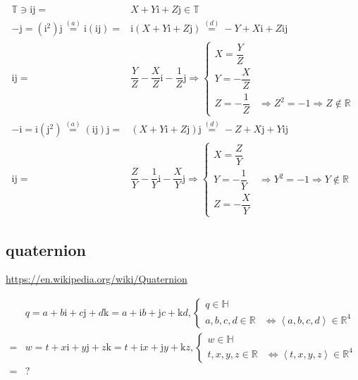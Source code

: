 \documentclass[
]{book}
\theoremstyle{definition}
\theoremstyle{definition}
\theoremstyle{definition}
\theoremstyle{definition}
\theoremstyle{remark}
\begin{document}
\[
\begin{aligned}
\mathbb{T}\ni\mathrm{i}\mathrm{j}= & X+Y\mathrm{i}+Z\mathrm{j}\in\mathbb{T}\\
-\mathrm{j}=\left(\mathrm{i}^{2}\right)\mathrm{j}\overset{\left(a\right)}{=}\mathrm{i}\left(\mathrm{i}\mathrm{j}\right)= & \mathrm{i}\left(X+Y\mathrm{i}+Z\mathrm{j}\right)\overset{\left(d\right)}{=}-Y+X\mathrm{i}+Z\mathrm{i}\mathrm{j}\\
\mathrm{i}\mathrm{j}= & \dfrac{Y}{Z}-\dfrac{X}{Z}\mathrm{i}-\dfrac{1}{Z}\mathrm{j}\Rightarrow\begin{cases}
X=\dfrac{Y}{Z}\\
Y=-\dfrac{X}{Z}\\
Z=-\dfrac{1}{Z} & \Rightarrow Z^{2}=-1\Rightarrow Z\notin\mathbb{R}
\end{cases}\\
-\mathrm{i}=\mathrm{i}\left(\mathrm{j}^{2}\right)\overset{\left(a\right)}{=}\left(\mathrm{i}\mathrm{j}\right)\mathrm{j}= & \left(X+Y\mathrm{i}+Z\mathrm{j}\right)\mathrm{j}\overset{\left(d\right)}{=}-Z+X\mathrm{j}+Y\mathrm{i}\mathrm{j}\\
\mathrm{i}\mathrm{j}= & \dfrac{Z}{Y}-\dfrac{1}{Y}\mathrm{i}-\dfrac{X}{Y}\mathrm{j}\Rightarrow\begin{cases}
X=\dfrac{Z}{Y}\\
Y=-\dfrac{1}{Y} & \Rightarrow Y^{2}=-1\Rightarrow Y\notin\mathbb{R}\\
Z=-\dfrac{X}{Y}
\end{cases}
\end{aligned}
\]

\subsection{quaternion}\label{quaternion-1}

\url{https://en.wikipedia.org/wiki/Quaternion}

\[
\begin{aligned}
 & q=a+b\mathrm{i}+c\mathrm{j}+d\mathrm{k}=a+\mathrm{i}b+\mathrm{j}c+\mathrm{k}d,\begin{cases}
q\in\mathbb{H}\\
a,b,c,d\in\mathbb{R} & \Leftrightarrow\left\langle a,b,c,d\right\rangle \in\mathbb{R}^{4}
\end{cases}\\
= & w=t+x\mathrm{i}+y\mathrm{j}+z\mathrm{k}=t+\mathrm{i}x+\mathrm{j}y+\mathrm{k}z,\begin{cases}
w\in\mathbb{H}\\
t,x,y,z\in\mathbb{R} & \Leftrightarrow\left\langle t,x,y,z\right\rangle \in\mathbb{R}^{4}
\end{cases}\\
= & ?
\end{aligned}
\]
\end{document}
